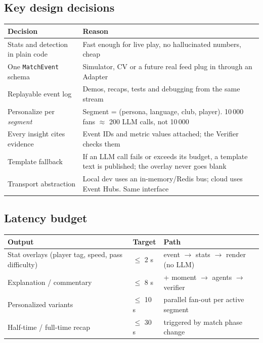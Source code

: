 \documentclass[11pt,a4paper]{article}
\begin{document}
\subsection{Key design decisions}
\begin{tabularx}{\linewidth}{@{}l Y@{}}
\toprule
Decision & Reason \\
\midrule
Stats and detection in plain code       & Fast enough for live play, no hallucinated numbers, cheap \\
One \texttt{MatchEvent} schema          & Simulator, CV or a future real feed plug in through an Adapter \\
Replayable event log                   & Demos, recaps, tests and debugging from the same stream \\
Personalize per \emph{segment}         & Segment = (persona, language, club, player). 10\,000 fans $\approx$ 200 LLM calls, not 10\,000 \\
Every insight cites evidence           & Event IDs and metric values attached; the Verifier checks them \\
Template fallback                      & If an LLM call fails or exceeds its budget, a template text is published; the overlay never goes blank \\
Transport abstraction                  & Local dev uses an in-memory/Redis bus; cloud uses Event Hubs. Same interface \\
\bottomrule
\end{tabularx}

\subsection{Latency budget}
\begin{tabularx}{\linewidth}{@{}l l Y@{}}
\toprule
Output & Target & Path \\
\midrule
Stat overlays (player tag, speed, pass difficulty) & $\le$ 2 s & event $\rightarrow$ stats $\rightarrow$ render (no LLM) \\
Explanation / commentary                          & $\le$ 8 s & + moment $\rightarrow$ agents $\rightarrow$ verifier \\
Personalized variants                             & $\le$ 10 s & parallel fan-out per active segment \\
Half-time / full-time recap                       & $\le$ 30 s & triggered by match phase change \\
\bottomrule
\end{tabularx}
\end{document}
